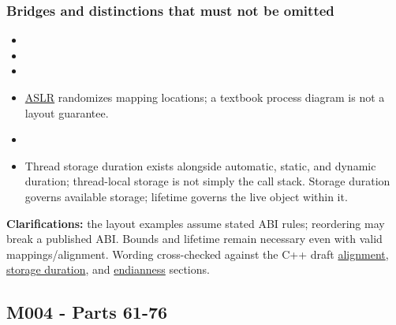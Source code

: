 \subsubsection{Bridges and distinctions that must not be omitted}\label{appendix-fd090d982a15-bridges-and-distinctions-that-must-not-be-omitted}

\begin{itemize}
\tightlist
\item
\item
\item
\item
  \hyperref[appendix-78cb248c8355]{ASLR} randomizes mapping locations; a textbook process diagram is not a layout guarantee.
\item
\item
  Thread storage duration exists alongside automatic, static, and dynamic duration; thread-local storage is not simply the call stack. Storage duration governs available storage; lifetime governs the live object within it.
\end{itemize}

\textbf{Clarifications:} the layout examples assume stated ABI rules; reordering may break a published ABI. Bounds and lifetime remain necessary even with valid mappings/alignment. Wording cross-checked against the C++ draft \href{https://eel.is/c++draft/basic.align}{alignment}, \href{https://eel.is/c++draft/basic.stc}{storage duration}, and \href{https://eel.is/c++draft/bit.endian}{endianness} sections.

\subsection{M004 - Parts 61-76}\label{appendix-fd090d982a15-m004---parts-61-76}

